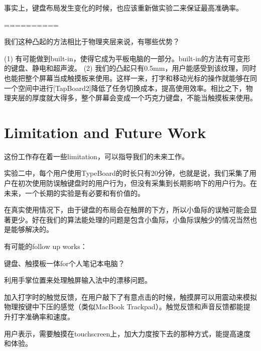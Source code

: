 事实上，键盘布局发生变化的时候，也应该重新做实验二来保证最高准确率。

==========

我们这种凸起的方法相比于物理夹层来说，有哪些优势？

(1) 有可能做到built-in，使得它成为平板电脑的一部分。built-in的方法有可变形的键盘、静电和超声波。
(2) 我们的凸起只有0.5mm，用户能感受到该纹理，同时也能把整个屏幕当成触摸板来使用。这样一来，打字和移动光标的操作就能够在同一个空间中进行[TapBoard2]降低了任务切换成本，提高使用效率。相比之下，物理夹层的厚度就大得多，整个屏幕会变成一个巧克力键盘，不能当触摸板来使用。

\section{Limitation and Future Work}

这份工作存在着一些limitation，可以指导我们的未来工作。

实验二中，每个用户使用TypeBoard的时长只有20分钟，也就是说，我们采集了用户在初次使用防误触键盘时的用户行为，但没有采集到长期影响下的用户行为。在未来，一个长期的实验是有必要和有价值的。

在真实使用情况下，由于键盘的布局会在触屏的下方，所以小鱼际的误触可能会显著更少。好在我们的算法能处理的问题是包含小鱼际，小鱼际误触少的情况当然也是能够解决的。

有可能的follow up works：

键盘、触摸板一体for个人笔记本电脑？

利用手掌位置来处理触屏输入法中的漂移问题。

加入打字时的触觉反馈，在用户敲下了有意点击的时候，触摸屏可以用震动来模拟物理按键中下压的感觉（类似MacBook Trackpad）。触觉反馈和声音反馈都能提升打字准确率和速度\cite{2015-Haptic}。

用户表示，需要触摸在touchscreen上，加大力度按下去的那种方式，能提高速度和体验。
